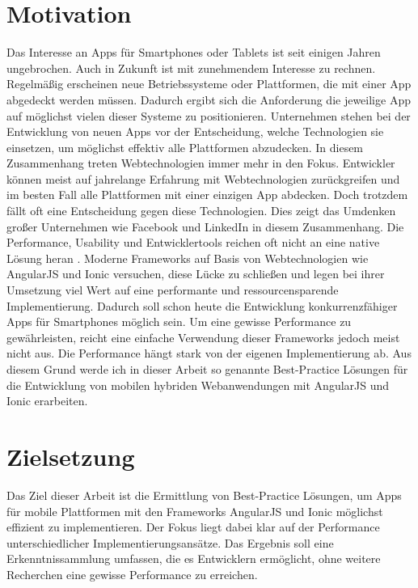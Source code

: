 
\section{Motivation}
Das Interesse an Apps für Smartphones oder Tablets ist seit einigen Jahren ungebrochen. Auch in Zukunft ist mit zunehmendem Interesse zu rechnen. Regelmäßig erscheinen neue Betriebssysteme oder Plattformen, die mit einer App abgedeckt werden müssen. Dadurch ergibt sich die Anforderung die jeweilige App auf möglichst vielen dieser Systeme zu positionieren. Unternehmen stehen bei der Entwicklung von neuen Apps vor der Entscheidung, welche Technologien sie einsetzen, um möglichst effektiv alle Plattformen abzudecken. In diesem Zusammenhang treten Webtechnologien immer mehr in den Fokus. Entwickler können meist auf jahrelange Erfahrung mit Webtechnologien zurückgreifen und im besten Fall alle Plattformen mit einer einzigen App abdecken. Doch trotzdem fällt oft eine Entscheidung gegen diese Technologien. Dies zeigt das Umdenken großer Unternehmen wie Facebook\cite{fb-enginering-backtonative} und LinkedIn\cite{li-engineering-backtonative} in diesem Zusammenhang. Die Performance, Usability und Entwicklertools reichen oft nicht an eine native Lösung heran \cite{mobilewebslow}. Moderne Frameworks auf Basis von Webtechnologien wie AngularJS und Ionic versuchen, diese Lücke zu schließen und legen bei ihrer Umsetzung viel Wert auf eine performante und ressourcensparende Implementierung. Dadurch soll schon heute die Entwicklung konkurrenzfähiger Apps für Smartphones möglich sein. Um eine gewisse Performance zu gewährleisten, reicht eine einfache Verwendung dieser Frameworks jedoch meist nicht aus. Die Performance hängt stark von der eigenen Implementierung ab. Aus diesem Grund werde ich in dieser Arbeit so genannte Best-Practice Lösungen für die Entwicklung von mobilen hybriden Webanwendungen mit AngularJS und Ionic erarbeiten. 

\section{Zielsetzung}
Das Ziel dieser Arbeit ist die Ermittlung von Best-Practice Lösungen, um Apps für mobile Plattformen mit den Frameworks AngularJS und Ionic möglichst effizient zu implementieren. Der Fokus liegt dabei klar auf der Performance unterschiedlicher Implementierungsansätze. Das Ergebnis soll eine Erkenntnissammlung umfassen, die es Entwicklern ermöglicht, ohne weitere Recherchen eine gewisse Performance zu erreichen. 

